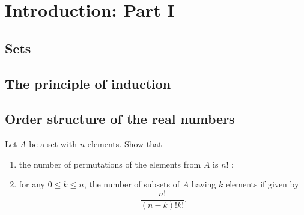 \chapter{Introduction: Part I}%
\label{cha:Introduction: Part I}
\section{Sets}%
\label{sec:Sets}
\section{The principle of induction}%
\label{sec:The principle of induction}
\section{Order structure of the real numbers}%
\label{sec:Order structure of the real numbers}

\begin{exercise}[1.11 TOOL]
    \label{ex:1.11}
    Let $A$ be a set with $n$ elements. Show that
    \begin{enumerate}
        \item the number of permutations of the elements from $A$ is $n!$ ;
        \item for any $0 \le k \le n$, the number of subsets of $A$ having $k$ elements if given by
            \[
            \frac{n!}{(n-k)!k!} 
            .\] 
    \end{enumerate}
\end{exercise}




